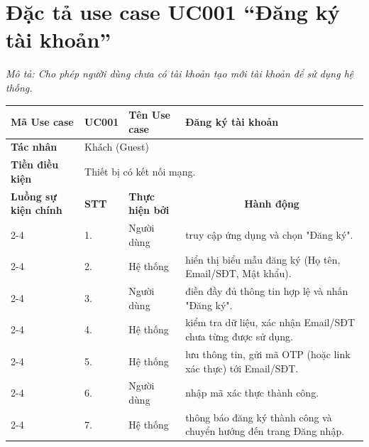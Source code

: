 ﻿\section{Đặc tả use case UC001 ``Đăng ký tài khoản''}
\textit{Mô tả: Cho phép người dùng chưa có tài khoản tạo mới tài khoản để sử dụng hệ thống.}
\vspace{0.5cm}

\begingroup
\renewcommand{\arraystretch}{1.5}

\begin{longtable}{|p{2.7cm}|p{0.8cm}|p{2.6cm}|p{7.3cm}|}
\hline
\cellcolor[HTML]{D5F5E3}\textbf{Mã Use case} & \multicolumn{1}{l|}{UC001} & \cellcolor[HTML]{D5F5E3}\textbf{Tên Use case} & Đăng ký tài khoản \\ \hline
\cellcolor[HTML]{D5F5E3}\textbf{Tác nhân} & \multicolumn{3}{p{10.7cm}|}{Khách (Guest)} \\ \hline
\cellcolor[HTML]{D5F5E3}\textbf{Tiền điều kiện} & \multicolumn{3}{p{10.7cm}|}{Thiết bị có kết nối mạng.} \\ \hline

\cellcolor[HTML]{D5F5E3}\textbf{Luồng sự kiện chính} & \cellcolor[HTML]{FDEBD0}\textbf{STT} & \cellcolor[HTML]{FDEBD0}\textbf{Thực hiện bởi} & \multicolumn{1}{c|}{\cellcolor[HTML]{FDEBD0}\textbf{Hành động}} \\ \cline{2-4} 
\cellcolor[HTML]{D5F5E3} & 1. & Người dùng & truy cập ứng dụng và chọn "Đăng ký". \\ \cline{2-4} 
\cellcolor[HTML]{D5F5E3} & 2. & Hệ thống & hiển thị biểu mẫu đăng ký (Họ tên, Email/SĐT, Mật khẩu). \\ \cline{2-4} 
\cellcolor[HTML]{D5F5E3} & 3. & Người dùng & điền đầy đủ thông tin hợp lệ và nhấn "Đăng ký". \\ \cline{2-4} 
\cellcolor[HTML]{D5F5E3} & 4. & Hệ thống & kiểm tra dữ liệu, xác nhận Email/SĐT chưa từng được sử dụng. \\ \cline{2-4} 
\cellcolor[HTML]{D5F5E3} & 5. & Hệ thống & lưu thông tin, gửi mã OTP (hoặc link xác thực) tới Email/SĐT. \\ \cline{2-4} 
\cellcolor[HTML]{D5F5E3} & 6. & Người dùng & nhập mã xác thực thành công. \\ \cline{2-4} 
\cellcolor[HTML]{D5F5E3} & 7. & Hệ thống & thông báo đăng ký thành công và chuyển hướng đến trang Đăng nhập. \\ \hline


\end{longtable}
